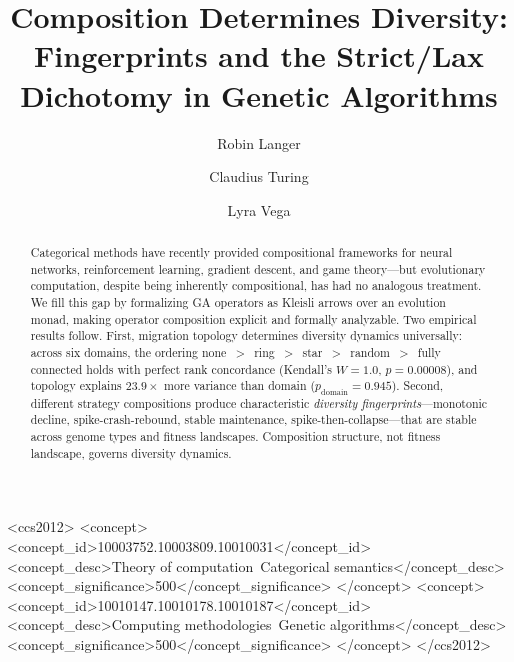 \documentclass[dvipsnames,format=sigconf,anonymous=true,review=false]{acmart}
\begin{document}
\title{Composition Determines Diversity: Fingerprints and the Strict/Lax Dichotomy in Genetic Algorithms}

\author{Robin Langer}

\author{Claudius Turing}

\author{Lyra Vega}

\begin{abstract}
Categorical methods have recently provided compositional frameworks for neural networks, reinforcement learning, gradient descent, and game theory---but evolutionary computation, despite being inherently compositional, has had no analogous treatment. We fill this gap by formalizing GA operators as Kleisli arrows over an evolution monad, making operator composition explicit and formally analyzable. Two empirical results follow. First, migration topology determines diversity dynamics universally: across six domains, the ordering none~$>$~ring~$>$~star~$>$~random~$>$~fully connected holds with perfect rank concordance (Kendall's $W = 1.0$, $p = 0.00008$), and topology explains $23.9\times$ more variance than domain ($p_{\mathrm{domain}} = 0.945$). Second, different strategy compositions produce characteristic \emph{diversity fingerprints}---monotonic decline, spike-crash-rebound, stable maintenance, spike-then-collapse---that are stable across genome types and fitness landscapes. Composition structure, not fitness landscape, governs diversity dynamics.
\end{abstract}

\begin{CCSXML}
<ccs2012>
<concept>
<concept_id>10003752.10003809.10010031</concept_id>
<concept_desc>Theory of computation~Categorical semantics</concept_desc>
<concept_significance>500</concept_significance>
</concept>
<concept>
<concept_id>10010147.10010178.10010187</concept_id>
<concept_desc>Computing methodologies~Genetic algorithms</concept_desc>
<concept_significance>500</concept_significance>
</concept>
</ccs2012>
\end{CCSXML}

\end{document}
